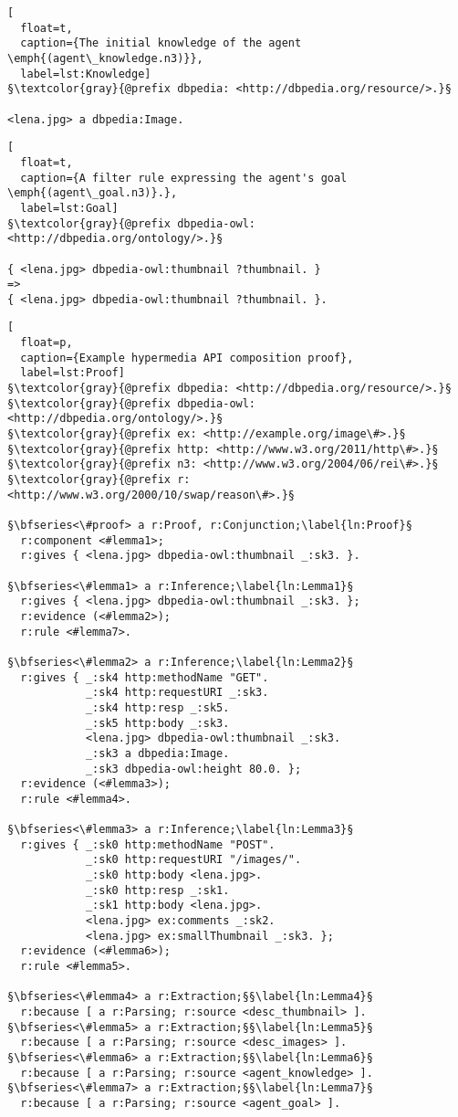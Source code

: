  \begin{lstlisting}[
  float=t,
  caption={The initial knowledge of the agent \emph{(agent\_knowledge.n3)}},
  label=lst:Knowledge]
§\textcolor{gray}{@prefix dbpedia: <http://dbpedia.org/resource/>.}§

<lena.jpg> a dbpedia:Image.
\end{lstlisting}

\begin{lstlisting}[
  float=t,
  caption={A filter rule expressing the agent's goal \emph{(agent\_goal.n3)}.},
  label=lst:Goal]
§\textcolor{gray}{@prefix dbpedia-owl: <http://dbpedia.org/ontology/>.}§

{ <lena.jpg> dbpedia-owl:thumbnail ?thumbnail. }
=>
{ <lena.jpg> dbpedia-owl:thumbnail ?thumbnail. }.
\end{lstlisting}

\begin{lstlisting}[
  float=p,
  caption={Example hypermedia API composition proof},
  label=lst:Proof]
§\textcolor{gray}{@prefix dbpedia: <http://dbpedia.org/resource/>.}§
§\textcolor{gray}{@prefix dbpedia-owl: <http://dbpedia.org/ontology/>.}§
§\textcolor{gray}{@prefix ex: <http://example.org/image\#>.}§
§\textcolor{gray}{@prefix http: <http://www.w3.org/2011/http\#>.}§
§\textcolor{gray}{@prefix n3: <http://www.w3.org/2004/06/rei\#>.}§
§\textcolor{gray}{@prefix r: <http://www.w3.org/2000/10/swap/reason\#>.}§

§\bfseries<\#proof> a r:Proof, r:Conjunction;\label{ln:Proof}§
  r:component <#lemma1>;
  r:gives { <lena.jpg> dbpedia-owl:thumbnail _:sk3. }.

§\bfseries<\#lemma1> a r:Inference;\label{ln:Lemma1}§
  r:gives { <lena.jpg> dbpedia-owl:thumbnail _:sk3. };
  r:evidence (<#lemma2>);
  r:rule <#lemma7>.
  
§\bfseries<\#lemma2> a r:Inference;\label{ln:Lemma2}§
  r:gives { _:sk4 http:methodName "GET".
            _:sk4 http:requestURI _:sk3.
            _:sk4 http:resp _:sk5.
            _:sk5 http:body _:sk3.
            <lena.jpg> dbpedia-owl:thumbnail _:sk3.
            _:sk3 a dbpedia:Image.
            _:sk3 dbpedia-owl:height 80.0. };
  r:evidence (<#lemma3>);
  r:rule <#lemma4>.
  
§\bfseries<\#lemma3> a r:Inference;\label{ln:Lemma3}§
  r:gives { _:sk0 http:methodName "POST".
            _:sk0 http:requestURI "/images/".
            _:sk0 http:body <lena.jpg>.
            _:sk0 http:resp _:sk1.
            _:sk1 http:body <lena.jpg>.
            <lena.jpg> ex:comments _:sk2.
            <lena.jpg> ex:smallThumbnail _:sk3. };  
  r:evidence (<#lemma6>);
  r:rule <#lemma5>.
  
§\bfseries<\#lemma4> a r:Extraction;§§\label{ln:Lemma4}§ 
  r:because [ a r:Parsing; r:source <desc_thumbnail> ].
§\bfseries<\#lemma5> a r:Extraction;§§\label{ln:Lemma5}§
  r:because [ a r:Parsing; r:source <desc_images> ].
§\bfseries<\#lemma6> a r:Extraction;§§\label{ln:Lemma6}§ 
  r:because [ a r:Parsing; r:source <agent_knowledge> ].
§\bfseries<\#lemma7> a r:Extraction;§§\label{ln:Lemma7}§
  r:because [ a r:Parsing; r:source <agent_goal> ].
\end{lstlisting}

